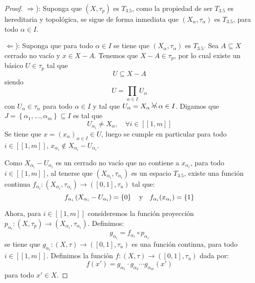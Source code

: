 \documentclass[12pt]{report}
\newcounter{it}
\theoremstyle{largebreak}
\newcommand\cf[3]{\ensuremath{#1:#2\rightarrow#3}}
\newcommand\natint[1]{\ensuremath{\left[\!\left[ #1\right]\!\right]}}
\newcommand{\afa}{\:
    \begin{tikzpicture}
        \draw [line width = 0.17 mm, black] (0,0) -- (-0.115,0.29);
        \draw [line width = 0.17 mm, black] (0,0) -- (0.115,0.29);
        \draw [line width = 0.17 mm, black] (-0.12,0) arc (190:-10:0.12cm);
    \end{tikzpicture}
    \:
}
\begin{document}
    \begin{proof}
        $\Rightarrow$): Suponga que $(X,\tau_p)$ es $T_{3.5}$, como la propiedad de ser $T_{3.5}$ es hereditaria y topológica, se sigue de forma inmediata que $(X_\alpha,\tau_\alpha)$ es $T_{3.5}$, para todo $\alpha\in I$.

        $\Leftarrow$): Suponga que para todo $\alpha\in I$ se tiene que $(X_\alpha,\tau_\alpha)$ es $T_{3.5}$. Sea $A\subseteq X$ cerrado no vacío y $x\in X-A$. Tenemos que $X-A\in\tau_p$, por lo cual existe un básico $U\in\tau_p$ tal que
        \begin{equation*}
            U\subseteq X-A
        \end{equation*}
        siendo
        \begin{equation*}
            U=\prod_{\alpha\in I}U_\alpha
        \end{equation*}
        con $U_\alpha\in\tau_\alpha$ para todo $\alpha\in I$ y tal que $U_\alpha=X_\alpha\afa\alpha\in I$. Digamos que $J=\left\{\alpha_1,...,\alpha_m \right\}\subseteq I$ es tal que
        \begin{equation*}
            U_{\alpha_i}\neq X_\alpha,\quad\forall i\in\natint{1,m}
        \end{equation*}
        Se tiene que $x=\left(x_\alpha\right)_{\alpha\in I}\in U$, luego se cumple en particular para todo $i\in\natint{1,m}$, $x_{\alpha_i}\notin X_{\alpha_i}-U_{\alpha_i}$.

        Como $X_{\alpha_i}-U_{\alpha_i}$ es un cerrado no vacío que no contiene a $x_{\alpha_i}$, para todo $i\in\natint{1,m}$, al tenerse que $(X_{\alpha_i},\tau_{\alpha_i})$ es un espacio $T_{3.5}$, existe una función continua $\cf{f_{\alpha_i}}{(X_{\alpha_i},\tau_{\alpha_i})}{([0,1],\tau_u)}$ tal que:
        \begin{equation}
            f_{\alpha_i}\left(X_{\alpha_i}-U_{\alpha_i}\right)=\left\{0\right\}\quad\textup{y}\quad f_{\alpha_i}(x_{\alpha_i})=\left\{1\right\}
        \end{equation}

        Ahora, para $i\in\natint{1,m}$ consideremos la función proyección $\cf{p_{\alpha_i}}{(X,\tau_p)}{(X_{\alpha_i},\tau_{\alpha_i})}$. Definimos:
        \begin{equation*}
            g_{\alpha_i}=f_{\alpha_i}\circ p_{\alpha_i}
        \end{equation*}
        se tiene que $\cf{g_{\alpha_i}}{(X,\tau)}{([0,1],\tau_u)}$ es una función continua, para todo $i\in\natint{1,m}$. Definimos la función $\cf{f}{(X,\tau)}{([0,1],\tau_u)}$ dada por:
        \begin{equation*}
            f(x')=g_{\alpha_1}\cdot g_{\alpha_2}\cdots g_{\alpha_m}(x')
        \end{equation*}
        para todo $x'\in X$.


\end{proof}
\end{document}
